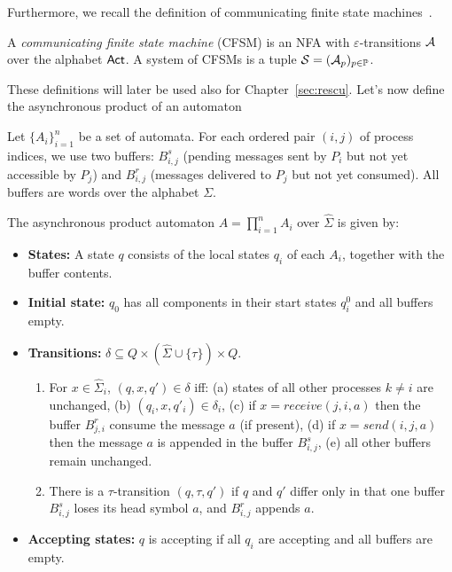 Furthermore, we recall the definition of communicating finite state machines~\cite{BrandZafiropulo}.

\bigskip

\begin{definition}[CFSM] \label{def:cfsm}
    A \emph{communicating finite state machine} (CFSM) is an NFA with 
    $\varepsilon$-transitions $\mathcal{A}$ over the alphabet $\mathsf{Act}$.  
    A system of CFSMs is a tuple $\mathcal{S} = (\mathcal{A}_p)_{p \in \mathbb{P}}$.
\end{definition}

These definitions will later be used also for Chapter~\ref{sec:rescu}.
Let's now define the asynchronous product of an automaton

\bigskip

\begin{definition}
Let $\{A_i\}_{i=1}^n$ be a set of automata. For each ordered pair 
$(i,j)$ of process indices, we use two buffers: $B^s_{i,j}$ 
(pending messages sent by $P_i$ but not yet accessible by $P_j$) 
and $B^r_{i,j}$ (messages delivered to $P_j$ but not yet consumed). 
All buffers are words over the alphabet $\Sigma$.

The asynchronous product automaton 
$A = \prod_{i=1}^n A_i$ over $\hat{\Sigma}$ is given by: %

\begin{itemize}
  \item \textbf{States:} A state $q$ consists of the local states 
  $q_i$ of each $A_i$, together with the buffer contents.
  \item \textbf{Initial state:} $q_0$ has all components in their 
  start states $q_i^0$ and all buffers empty.
  \item \textbf{Transitions:} $\delta \subseteq Q \times 
  (\hat{\Sigma} \cup \{\tau\}) \times Q$.
    \begin{enumerate}
      \item For $x \in \hat{\Sigma}_i$, $(q,x,q') \in \delta$ iff:  
      (a) states of all other processes $k \neq i$ are unchanged,  
      (b) $(q_i,x,q'_i) \in \delta_i$,  
      (c) if $x = receive(j,i,a)$ then the buffer $B^r_{j,i}$ consume the message $a$ (if present),  
      (d) if $x = send(i,j,a)$ then the message $a$ is appended in the buffer $B^s_{i,j}$,  
      (e) all other buffers remain unchanged.
      \item There is a $\tau$-transition $(q,\tau,q')$ if $q$ and 
      $q'$ differ only in that one buffer $B^s_{i,j}$ loses its 
      head symbol $a$, and $B^r_{i,j}$ appends $a$.
    \end{enumerate}
  \item \textbf{Accepting states:} $q$ is accepting if all $q_i$ 
  are accepting and all buffers are empty.
\end{itemize}


\end{definition}
